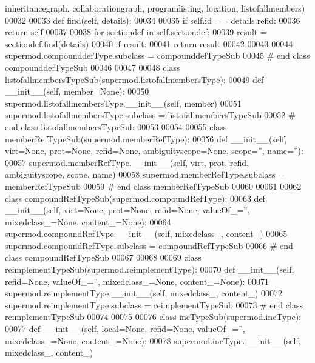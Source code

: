 \begin{DoxyCode}
      inheritancegraph, collaborationgraph, programlisting, location, listofallmembers)
00032 
00033     \textcolor{keyword}{def }find(self, details):
00034 
00035         \textcolor{keywordflow}{if} self.id == details.refid:
00036             \textcolor{keywordflow}{return} self
00037 
00038         \textcolor{keywordflow}{for} sectiondef \textcolor{keywordflow}{in} self.sectiondef:
00039             result = sectiondef.find(details)
00040             \textcolor{keywordflow}{if} result:
00041                 \textcolor{keywordflow}{return} result
00042 
00043 
00044 supermod.compounddefType.subclass = compounddefTypeSub
00045 \textcolor{comment}{# end class compounddefTypeSub}
00046 
00047 
00048 \textcolor{keyword}{class }listofallmembersTypeSub(supermod.listofallmembersType):
00049     \textcolor{keyword}{def }__init__(self, member=None):
00050         supermod.listofallmembersType.\_\_init\_\_(self, member)
00051 supermod.listofallmembersType.subclass = listofallmembersTypeSub
00052 \textcolor{comment}{# end class listofallmembersTypeSub}
00053 
00054 
00055 \textcolor{keyword}{class }memberRefTypeSub(supermod.memberRefType):
00056     \textcolor{keyword}{def }__init__(self, virt=None, prot=None, refid=None, ambiguityscope=None, scope='', name=''):
00057         supermod.memberRefType.\_\_init\_\_(self, virt, prot, refid, ambiguityscope, scope, name)
00058 supermod.memberRefType.subclass = memberRefTypeSub
00059 \textcolor{comment}{# end class memberRefTypeSub}
00060 
00061 
00062 \textcolor{keyword}{class }compoundRefTypeSub(supermod.compoundRefType):
00063     \textcolor{keyword}{def }__init__(self, virt=None, prot=None, refid=None, valueOf\_='', mixedclass\_=None, content\_=None):
00064         supermod.compoundRefType.\_\_init\_\_(self, mixedclass\_, content\_)
00065 supermod.compoundRefType.subclass = compoundRefTypeSub
00066 \textcolor{comment}{# end class compoundRefTypeSub}
00067 
00068 
00069 \textcolor{keyword}{class }reimplementTypeSub(supermod.reimplementType):
00070     \textcolor{keyword}{def }__init__(self, refid=None, valueOf\_='', mixedclass\_=None, content\_=None):
00071         supermod.reimplementType.\_\_init\_\_(self, mixedclass\_, content\_)
00072 supermod.reimplementType.subclass = reimplementTypeSub
00073 \textcolor{comment}{# end class reimplementTypeSub}
00074 
00075 
00076 \textcolor{keyword}{class }incTypeSub(supermod.incType):
00077     \textcolor{keyword}{def }__init__(self, local=None, refid=None, valueOf\_='', mixedclass\_=None, content\_=None):
00078         supermod.incType.\_\_init\_\_(self, mixedclass\_, content\_)

\end{DoxyCode}
